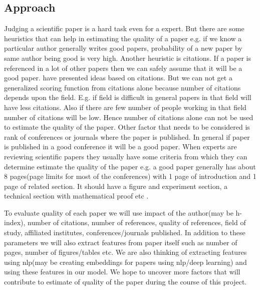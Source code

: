 \documentclass[a4paper, 11pt]{article}
\begin{document}
\subsection{Approach}
Judging a scientific paper is a hard task even for a expert. But there are some heuristics that can help in estimating the quality of a paper e.g. if we know a particular author generally writes good papers, probability of a new paper by same author being good is very high. Another heuristic is citations. If a paper is referenced in a lot of other papers then we can safely assume that it will be a good paper. \cite{Hirsch} \cite{pinksi} have presented ideas based on citations. But we can not get a generalized scoring function from citations alone because number of citations depends upon the field. E.g. if field is difficult in general papers in that field will have less citations. Also if there are few number of people working in that field number of citations will be low. Hence number of citations alone can not be used to estimate the quality of the paper. Other factor that needs to be considered is rank of conferences or journals where the paper is published. In general if paper is published in a good conference it will be a good paper.  When experts are reviewing scientific papers they usually have some criteria from which they can determine estimate the quality of the paper e.g. a good paper generally has about 8 pages(page limits for most of the conferences) with 1 page of introduction and 1 page of related section. It should have a figure and experiment section, a technical section with mathematical proof etc \cite{karpathy}.  
\par
To evaluate quality of each paper we will use impact of the author(may be h-index), number of citations, number of references, quality of references, field of study, affiliated institutes, conferences/journals published. In addition to these parameters we will also extract features from paper itself such as number of pages, number of figures/tables etc. We are also thinking of extracting features using nlp(may be creating embeddings for papers using nlp/deep learning) and using these features in our model. We hope to uncover more factors that will contribute to estimate of quality of the paper during the course of this project.
\end{document}
